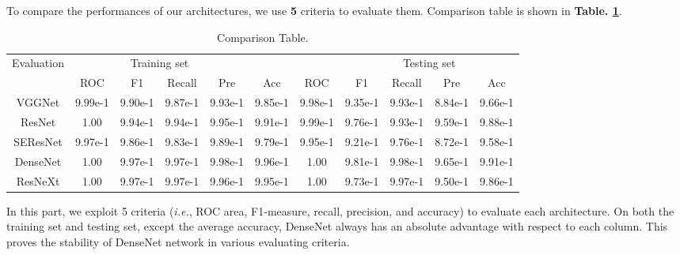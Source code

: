\documentclass[a4paper]{article}
\begin{document}
\large{
To compare the performances of our architectures, we use \textbf{5} criteria to evaluate them. Comparison table is shown in \textbf{Table. \ref{comparetable}}.

\begin{table}[h]

\scriptsize

\centering

\caption{Comparison Table.}

\label{comparetable}

\begin{tabular}{ccccccccccc}
\\
\toprule

\multirow{2}{*}{Evaluation} && \multicolumn{2}{c}{Training set} &&&&& \multicolumn{2}{c}{Testing set} \\

\cmidrule(r){2-6}  \cmidrule(r){7-11}

\tiny{&   ROC   & F1  & Recall   & Pre   & Acc

&  ROC   & F1  & Recall   & Pre   & Acc} \\

\midrule

\textsf{VGGNet} \tiny{&9.99e-1 &9.90e-1 &9.87e-1 &9.93e-1  &9.85e-1 &9.98e-1 &9.35e-1 &9.93e-1 &8.84e-1  &9.66e-1}  \\

\textsf{ResNet}  \tiny{&1.00 &9.94e-1 &9.94e-1 &9.95e-1  &9.91e-1 &9.99e-1 &9.76e-1 &9.93e-1 &9.59e-1  &9.88e-1}  \\

\textsf{SEResNet}  \tiny{&9.97e-1 &9.86e-1 &9.83e-1 &9.89e-1  &9.79e-1    &9.95e-1 &9.21e-1 &9.76e-1 &8.72e-1  &9.58e-1}  \\

\textsf{DenseNet}  \tiny{&1.00 &9.97e-1 &9.97e-1 &9.98e-1  &9.96e-1 &1.00 &9.81e-1 &9.98e-1 &9.65e-1 &9.91e-1 }  \\

\textsf{ResNeXt}  \tiny{&1.00 &9.97e-1 &9.97e-1 &9.96e-1  &9.95e-1 &1.00 &9.73e-1 &9.97e-1 &9.50e-1 &9.86e-1}  \\

\bottomrule

\end{tabular}

\end{table}

In this part, we exploit 5 criteria (\textit{i.e.}, ROC area, F1-measure, recall, precision, and accuracy) to evaluate each architecture. On both the training set and testing set, except the average accuracy, \textsf{DenseNet} always has an absolute advantage with respect to each column. This proves the stability of \textsf{DenseNet} network in various evaluating criteria.
}
\end{document}
